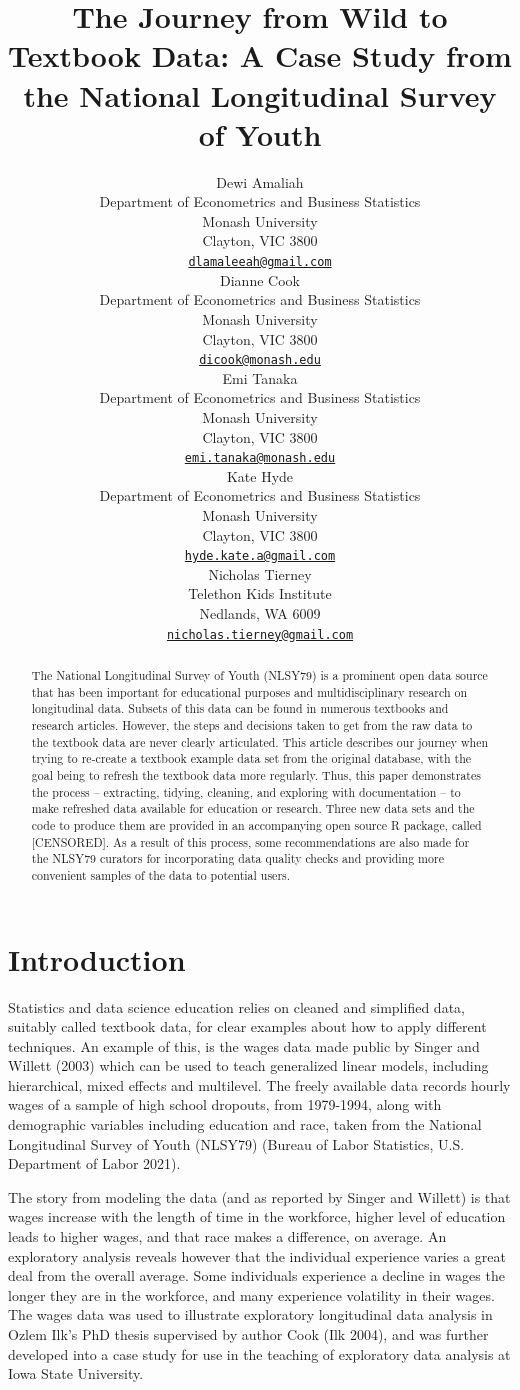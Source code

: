 \documentclass{article}
\title{The Journey from Wild to Textbook Data: A Case Study from the National Longitudinal Survey of Youth}
\author{
    Dewi Amaliah
   \\
    Department of Econometrics and Business Statistics \\
    Monash University \\
  Clayton, VIC 3800 \\
  \texttt{\href{mailto:dlamaleeah@gmail.com}{\nolinkurl{dlamaleeah@gmail.com}}} \\
   \And
    Dianne Cook
   \\
    Department of Econometrics and Business Statistics \\
    Monash University \\
  Clayton, VIC 3800 \\
  \texttt{\href{mailto:dicook@monash.edu}{\nolinkurl{dicook@monash.edu}}} \\
   \And
    Emi Tanaka
   \\
    Department of Econometrics and Business Statistics \\
    Monash University \\
  Clayton, VIC 3800 \\
  \texttt{\href{mailto:emi.tanaka@monash.edu}{\nolinkurl{emi.tanaka@monash.edu}}} \\
   \And
    Kate Hyde
   \\
    Department of Econometrics and Business Statistics \\
    Monash University \\
  Clayton, VIC 3800 \\
  \texttt{\href{mailto:hyde.kate.a@gmail.com}{\nolinkurl{hyde.kate.a@gmail.com}}} \\
   \And
    Nicholas Tierney
   \\
    Telethon Kids Institute \\
  Nedlands, WA 6009 \\
  \texttt{\href{mailto:nicholas.tierney@gmail.com}{\nolinkurl{nicholas.tierney@gmail.com}}} \\
  }
\begin{document}
\maketitle


\begin{abstract}
The National Longitudinal Survey of Youth (NLSY79) is a prominent open data source that has been important for educational purposes and multidisciplinary research on longitudinal data. Subsets of this data can be found in numerous textbooks and research articles. However, the steps and decisions taken to get from the raw data to the textbook data are never clearly articulated. This article describes our journey when trying to re-create a textbook example data set from the original database, with the goal being to refresh the textbook data more regularly. Thus, this paper demonstrates the process -- extracting, tidying, cleaning, and exploring with documentation -- to make refreshed data available for education or research. Three new data sets and the code to produce them are provided in an accompanying open source R package, called {[}CENSORED{]}. As a result of this process, some recommendations are also made for the NLSY79 curators for incorporating data quality checks and providing more convenient samples of the data to potential users.
\end{abstract}


\hypertarget{intro}{%
\section{Introduction}\label{intro}}

Statistics and data science education relies on cleaned and simplified data, suitably called textbook data, for clear examples about how to apply different techniques. An example of this, is the wages data made public by Singer and Willett (2003) which can be used to teach generalized linear models, including hierarchical, mixed effects and multilevel. The freely available data records hourly wages of a sample of high school dropouts, from 1979-1994, along with demographic variables including education and race, taken from the National Longitudinal Survey of Youth (NLSY79) (Bureau of Labor Statistics, U.S. Department of Labor 2021).

The story from modeling the data (and as reported by Singer and Willett) is that wages increase with the length of time in the workforce, higher level of education leads to higher wages, and that race makes a difference, on average. An exploratory analysis reveals however that the individual experience varies a great deal from the overall average. Some individuals experience a decline in wages the longer they are in the workforce, and many experience volatility in their wages. The wages data was used to illustrate exploratory longitudinal data analysis in Ozlem Ilk's PhD thesis supervised by author Cook (Ilk 2004), and was further developed into a case study for use in the teaching of exploratory data analysis at Iowa State University.
\end{document}
